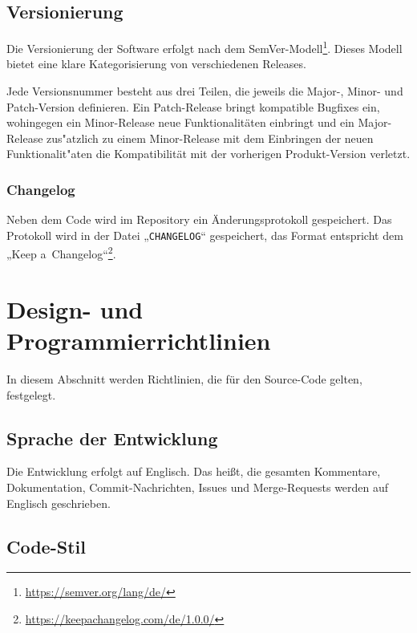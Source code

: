 \documentclass{article}
\begin{document}
\subsection{Versionierung}

Die Versionierung der Software erfolgt nach dem SemVer-Modell\footnote{\url{https://semver.org/lang/de/}}. Dieses Modell bietet eine klare Kategorisierung von verschiedenen Releases.

Jede Versionsnummer besteht aus drei Teilen, die jeweils die Major-, Minor- und Patch-Version definieren. Ein Patch-Release bringt kompatible Bugfixes ein, wohingegen ein Minor-Release neue Funktionalitäten einbringt und ein Major-Release zus"atzlich zu einem Minor-Release mit dem Einbringen der neuen Funktionalit"aten die Kompatibilität mit der vorherigen Produkt-Version verletzt.

\subsubsection{Changelog}

Neben dem Code wird im Repository ein Änderungsprotokoll gespeichert. Das Protokoll wird in der Datei „\texttt{CHANGELOG}“ gespeichert, das Format entspricht dem „Keep a~Changelog“\footnote{\url{https://keepachangelog.com/de/1.0.0/}}.


\section{Design- und Programmierrichtlinien}

In diesem Abschnitt werden Richtlinien, die für den Source-Code gelten, festgelegt.

\subsection{Sprache der Entwicklung}

Die Entwicklung erfolgt auf Englisch. Das heißt, die gesamten Kommentare, Dokumentation, Commit-Nachrichten, Issues und Merge-Requests werden auf Englisch geschrieben.

\subsection{Code-Stil}\label{angebot:entwicklungsrichtlinien:codestyle}
\end{document}

